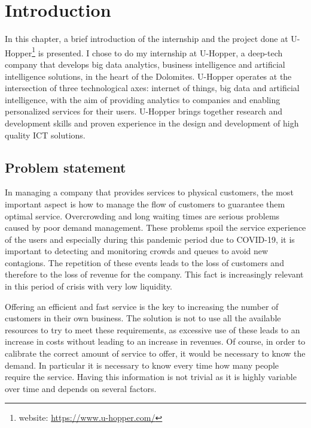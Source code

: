 \chapter{Introduction}
\label{cha:intro}
\vspace{0.4 cm} 

In this chapter, a brief introduction of the internship and the project done at U-Hopper\footnote{ website: \url{https://www.u-hopper.com/} } is presented.
I chose to do my internship at U-Hopper, a deep-tech company that develops big data analytics, business intelligence and artificial intelligence solutions, in the heart of the Dolomites.
U-Hopper operates at the intersection of three technological axes: internet of things, big data and artificial intelligence, with the aim of providing analytics to companies and enabling personalized services for their users.
U-Hopper brings together research and development skills and proven experience in the design and development of high quality ICT solutions.


\section{Problem statement}
\label{sec:problem}
\vspace{0.2 cm} 

In managing a company that provides services to physical customers, the most important aspect is how to manage the flow of customers to guarantee them optimal service. Overcrowding and long waiting times are serious problems caused by poor demand management. These problems spoil the service experience of the users and especially during this pandemic period due to COVID-19, it is important to detecting and monitoring crowds and queues to avoid new contagions. The repetition of these events leads to the loss of customers and therefore to the loss of revenue for the company. This fact is increasingly relevant in this period of crisis with very low liquidity.

Offering an efficient and fast service is the key to increasing the number of customers in their own business. The solution is not to use all the available resources to try to meet these requirements, as excessive use of these leads to an increase in costs without leading to an increase in revenues.
Of course, in order to calibrate the correct amount of service to offer, it would be necessary to know the demand. In particular it is necessary to know every time how many people require the service. Having this information is not trivial as it is highly variable over time and depends on several factors.

